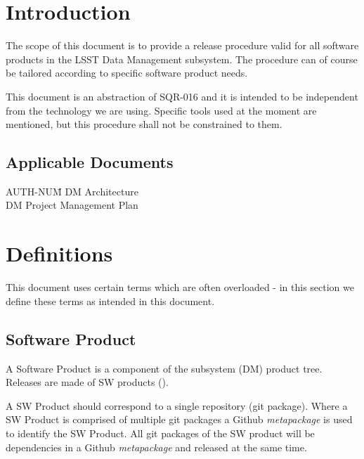 \section{Introduction} \label{sec:intro}

The scope of this document is to provide a release procedure valid for all software products in the LSST Data Management subsystem. The procedure can of course be tailored according to specific software product needs.

This document is an abstraction of SQR-016 and it is intended to be independent from the technology we are using. 
Specific tools used at the moment are mentioned, but this procedure shall not be constrained to them.


\subsection{Applicable Documents}

\begin{tabbing}
AUTH-NUM\= \kill
{} \>     DM Architecture\\
 \>     DM Project Management Plan   \\
\end{tabbing}


\newpage
\section{Definitions} \label{sec:definitions}

This document uses certain terms which are often overloaded -  in this section we define these terms  as intended in this document.


\subsection{Software Product} \label{sec:swprod}

A Software Product is a component of the subsystem (DM) product tree.
Releases are made of  SW products ().

A SW Product should correspond to a single repository (git package).
Where a SW Product is comprised of multiple git packages
a Github \textit{metapackage} is used to identify the SW Product.
All git packages of the SW product will be dependencies in a Github \textit{metapackage} and released at the same time.


